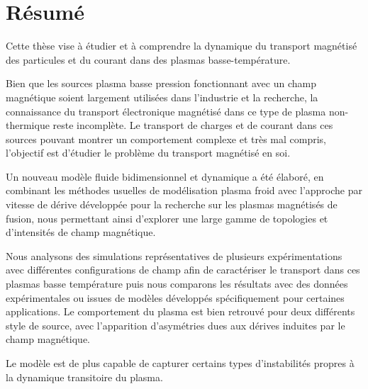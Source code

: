 \thispagestyle{empty}
\cleardoublepage
\thispagestyle{preface}	
	\section*{Résumé}
		Cette thèse vise à étudier et à comprendre la dynamique du transport
		magnétisé des particules et du courant dans des plasmas basse-température.
		
		Bien que les sources plasma basse pression fonctionnant avec un champ
		magnétique soient largement utilisées dans l'industrie et la recherche, la
		connaissance du transport électronique magnétisé dans ce type de plasma
		non-thermique reste incomplète. Le transport de charges et de courant dans
		ces sources pouvant montrer un comportement complexe et très mal compris,
		l'objectif est d'étudier le problème du transport magnétisé en
		soi. 
		
		Un nouveau modèle fluide bidimensionnel et dynamique a été élaboré, en
		combinant les méthodes usuelles de modélisation plasma froid avec l'approche
		par vitesse de dérive développée pour la recherche sur les plasmas magnétisés
		de fusion, nous permettant ainsi d'explorer une large gamme de topologies et
		d'intensités de champ magnétique.
		
		Nous analysons des simulations représentatives de plusieurs expérimentations
		avec différentes configurations de champ afin de caractériser le transport
		dans ces plasmas basse température puis nous comparons les résultats avec des
		données expérimentales ou issues de modèles développés spécifiquement pour
		certaines applications. Le comportement du plasma est bien retrouvé pour deux
		différents style de source, avec l’apparition d’asymétries dues aux dérives
		induites par le champ magnétique. 
		
		Le modèle est de plus capable de capturer
		certains types d'instabilités propres à la dynamique transitoire du plasma.		